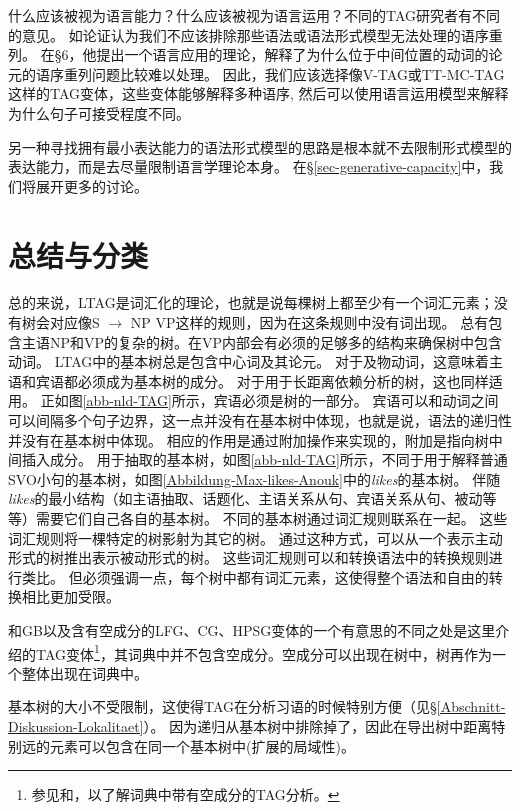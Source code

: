 什么应该被视为语言能力？什么应该被视为语言运用？不同的TAG研究者有不同的意见。
如\citet[]{Rambow94a}论证认为我们不应该排除那些语法或语法形式模型无法处理的语序重列。
在\S 6，他提出一个语言应用的理论，解释了为什么位于中间位置的动词的论元的语序重列问题比较难以处理。
因此，我们应该选择像V-TAG或TT-MC-TAG这样的TAG变体\citep{Lichte2007a}，这些变体能够解释多种语序,
然后可以使用语言运用模型来解释为什么句子可接受程度不同。

另一种寻找拥有最小表达能力的语法形式模型的思路是根本就不去限制形式模型的表达能力，而是去尽量限制语言学理论本身。
在\S \ref{sec-generative-capacity}中，我们将展开更多的讨论。

\section{总结与分类}

总的来说，LTAG是词汇化的理论，也就是说每棵树上都至少有一个词汇元素；没有树会对应像S $\to$ NP VP这样的规则，因为在这条规则中没有词出现。
总有包含主语NP和VP的复杂的树。在VP内部会有必须的足够多的结构来确保树中包含动词。
LTAG中的基本树总是包含中心词及其论元。
对于及物动词，这意味着主语和宾语都必须成为基本树的成分。
对于用于长距离依赖分析的树，这也同样适用。
正如图\ref{abb-nld-TAG}所示，宾语必须是树的一部分。
宾语可以和动词之间可以间隔多个句子边界，这一点并没有在基本树中体现，也就是说，语法的递归性并没有在基本树中体现。
相应的作用是通过附加操作来实现的，附加是指向树中间插入成分。
用于抽取的基本树，如图\ref{abb-nld-TAG}所示，不同于用于解释普通SVO小句的基本树，如图\ref{Abbildung-Max-likes-Anouk}中的\emph{likes}的基本树。 
伴随\emph{likes}的最小结构（如主语抽取、话题化、主语关系从句、宾语关系从句、被动等等）需要它们自己各自的基本树\citep[]{KJ2003a}。
不同的基本树通过词汇规则联系在一起。
这些词汇规则将一棵特定的树影射为其它的树。
通过这种方式，可以从一个表示主动形式的树推出表示被动形式的树。
这些词汇规则可以和转换语法中的转换规则进行类比。 
但必须强调一点，每个树中都有词汇元素，这使得整个语法和自由的转换相比更加受限。

和GB以及含有空成分的LFG、CG、HPSG变体的一个有意思的不同之处是这里介绍的TAG变体\footnote{
  参见和，以了解词典中带有空成分的TAG分析。
}，其词典中并不包含空成分。空成分可以出现在树中，树再作为一个整体出现在词典中。

基本树的大小不受限制，这使得TAG在分析习语的时候特别方便（见\S \ref{Abschnitt-Diskussion-Lokalitaet}）。
因为递归从基本树中排除掉了，因此在导出树中距离特别远的元素可以包含在同一个基本树中(扩展的局域性)。


